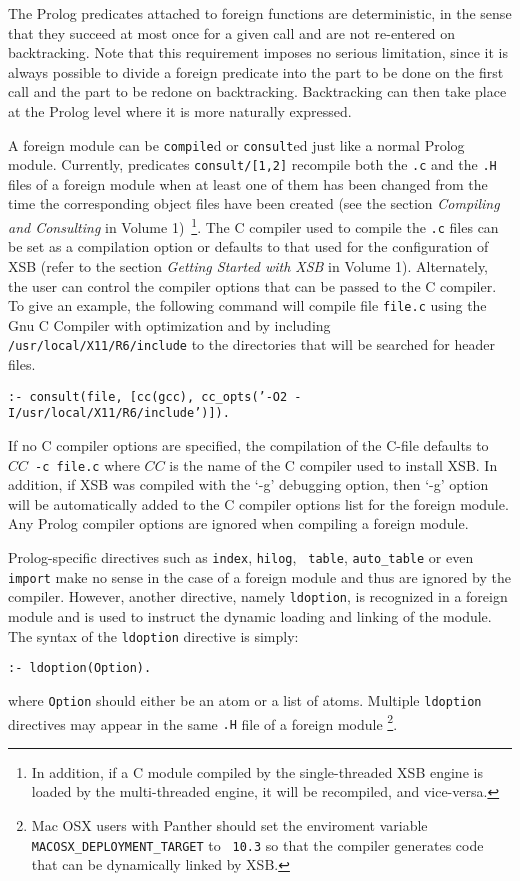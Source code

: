 The Prolog predicates attached to foreign functions are deterministic,
in the sense that they succeed at most once for a given call and are
not re-entered on backtracking.  Note that this requirement imposes no
serious limitation, since it is always possible to divide a foreign
predicate into the part to be done on the first call and the part to
be redone on backtracking.  Backtracking can then take place at the
Prolog level where it is more naturally expressed.

A foreign module can be {\tt compile}d or {\tt consult}ed just like a
normal Prolog module.  Currently, predicates {\tt consult/[1,2]}
recompile both the {\tt *.c} and the {\tt *.H} files of a foreign
module when at least one of them has been changed from the time the
corresponding object files have been created (see the section {\it
  Compiling and Consulting} in Volume 1)~\footnote{In addition, if a C
  module compiled by the single-threaded XSB engine is loaded by the
  multi-threaded engine, it will be recompiled, and vice-versa.}.  The
C compiler used to compile the {\tt *.c} files can be set as a
compilation option or defaults to that used for the configuration of
XSB (refer to the section {\it Getting Started with XSB} in Volume 1).
Alternately, the user can control the compiler options that can be
passed to the C compiler.  To give an example, the following command
will compile file {\tt file.c} using the Gnu C Compiler with
optimization and by including {\tt /usr/local/X11/R6/include} to the
directories that will be searched for header files.
\begin{center}
{\tt  :- consult(file,
                 [cc(gcc), cc\_opts('-O2 -I/usr/local/X11/R6/include')]). }
\end{center}
If no C compiler options are specified, the compilation of the C-file
defaults to $CC$~{\tt -c~file.c} where $CC$ is the name of the C
compiler used to install XSB.  In addition, if XSB was compiled with
the `-g' debugging option, then `-g' option will be automatically
added to the C compiler options list for the foreign module.  Any
Prolog compiler options are ignored when compiling a foreign module.

Prolog-specific directives such as {\tt index}, {\tt hilog}, {\tt
  table}, {\tt auto\_table} or even {\tt import} make no sense in the
case of a foreign module and thus are ignored by the compiler.
However, another directive, namely {\tt ldoption}, is recognized in a
foreign module and is used to instruct the dynamic loading and linking
of the module.  The syntax of the {\tt ldoption} directive is simply:
\begin{center}
{\tt  :- ldoption(Option).    }
\end{center}
where {\tt Option} should either be an atom or a list of atoms.
Multiple {\tt ldoption} directives may appear in the same {\tt .H}
file of a foreign module \footnote{Mac OSX users with Panther should
  set the enviroment variable {\tt MACOSX\_DEPLOYMENT\_TARGET} to {\tt
    10.3} so that the compiler generates code that can be dynamically
  linked by XSB.}.

